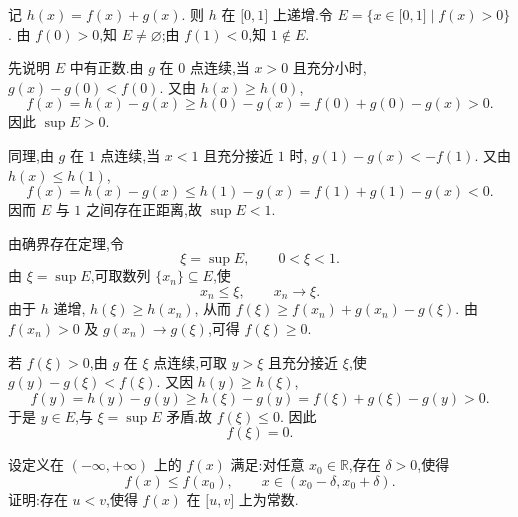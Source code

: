 \begin{solution}
    记 $h(x)=f(x)+g(x)$. 则 $h$ 在 $\lbrack0,1\rbrack$ 上递增.令 $E=\{x\in\lbrack0,1\rbrack\mid f(x)>0\}$.
    由 $f(0)>0$,知 $E\neq\varnothing$;由 $f(1)<0$,知 $1\notin E$.

    先说明 $E$ 中有正数.由 $g$ 在 $0$ 点连续,当 $x>0$ 且充分小时, $g(x)-g(0)<f(0)$.
    又由 $h(x)\geq h(0)$,
    \[
        f(x)
        =h(x)-g(x)
        \geq h(0)-g(x)
        =f(0)+g(0)-g(x)>0.
    \]
    因此 $\sup E>0$.

    同理,由 $g$ 在 $1$ 点连续,当 $x<1$ 且充分接近 $1$ 时, $g(1)-g(x)<-f(1)$.
    又由 $h(x)\leq h(1)$,
    \[
        f(x)
        =h(x)-g(x)
        \leq h(1)-g(x)
        =f(1)+g(1)-g(x)<0.
    \]
    因而 $E$ 与 $1$ 之间存在正距离,故 $\sup E<1$.

    由确界存在定理,令
    \[
        \xi=\sup E,
        \qquad
        0<\xi<1.
    \]
    由 $\xi=\sup E$,可取数列 $\{x_n\}\subseteq E$,使
    \[
        x_n\leq\xi,
        \qquad
        x_n\to\xi.
    \]
    由于 $h$ 递增, $h(\xi)\geq h(x_n)$, 从而 $f(\xi) \geq f(x_n)+g(x_n)-g(\xi)$. 由 $f(x_n)>0$ 及
    $g(x_n)\to g(\xi)$,可得 $f(\xi)\geq0$.

    若 $f(\xi)>0$,由 $g$ 在 $\xi$ 点连续,可取 $y>\xi$ 且充分接近 $\xi$,使 $g(y)-g(\xi)<f(\xi)$.
    又因 $h(y)\geq h(\xi)$,
    \[
        f(y)
        =h(y)-g(y)
        \geq h(\xi)-g(y)
        =f(\xi)+g(\xi)-g(y)>0.
    \]
    于是 $y\in E$,与 $\xi=\sup E$ 矛盾.故 $f(\xi)\leq0$.
    因此
    \[
        f(\xi)=0.
    \]
\end{solution}

\begin{example}
    设定义在 $(-\infty,+\infty)$ 上的 $f(x)$ 满足:对任意 $x_0\in\mathbb{R}$,存在 $\delta>0$,使得
    \[
        f(x)\leq f(x_0),
        \qquad
        x\in(x_0-\delta,x_0+\delta).
    \]
    证明:存在 $u<v$,使得 $f(x)$ 在 $\lbrack u,v\rbrack$ 上为常数.
\end{example}
\exampleblank

